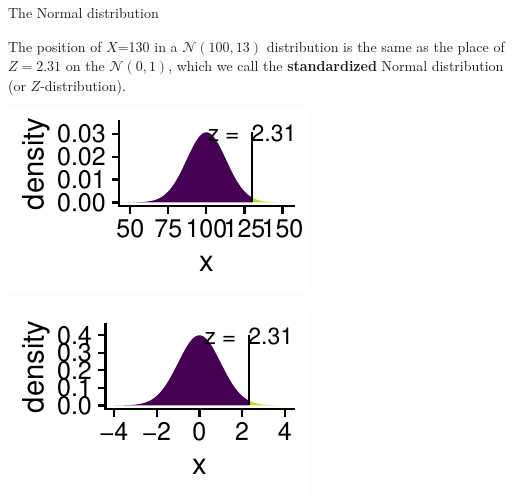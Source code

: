 \documentclass[10pt,handout]{beamer}\usepackage[]{graphicx}\usepackage[]{color}
\newenvironment{knitrout}{}{} %
\begin{document}
\begin{frame}[fragile]{The Normal distribution}
	
	\vspace*{-.01in}
	
	\small{The position of $X$=130 in a $\mathcal{N}(100,13)$ distribution is the same as
		the place of $Z=2.31$ on the $\mathcal{N}(0,1)$, which we call the \textbf{standardized} Normal distribution (or	$Z$-distribution).}
	
	
\begin{knitrout}\tiny
{}\color{fgcolor}

{\centering \includegraphics[width=0.55\linewidth]{figure/probs-1} 

}




{\centering \includegraphics[width=0.55\linewidth]{figure/probs-2} 

}


\end{knitrout}
	
\end{frame} 

\end{document}
